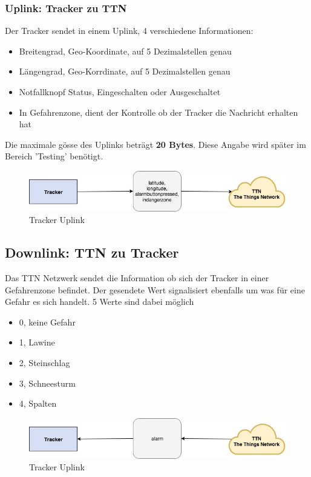 \documentclass[11pt,english,german]{report}
\theoremstyle{definition}
\begin{document}
\subsubsection{Uplink: Tracker zu TTN}
Der Tracker sendet in einem Uplink, 4 verschiedene Informationen:
\begin{itemize}
	\item Breitengrad, Geo-Koordinate, auf 5 Dezimalstellen genau
	\item Längengrad, Geo-Korrdinate, auf 5 Dezimalstellen genau
	\item Notfallknopf Status, Eingeschalten oder Ausgeschaltet
	\item In Gefahrenzone, dient der Kontrolle ob der Tracker die Nachricht erhalten hat
\end{itemize}
Die maximale gösse des Uplinks beträgt \textbf{20 Bytes}. Diese Angabe wird später im Bereich 'Testing' benötigt.
\begin{figure}[H]
	\centering
	\includegraphics[width=\textwidth]{img/system/dataflow_tracker2ttn_uplink.jpg}
	\caption[Tracker Uplink]
	{Tracker Uplink}
\end{figure}

\subsection{Downlink: TTN zu Tracker}
Das TTN Netzwerk sendet die Information ob sich der Tracker in einer Gefahrenzone befindet. Der gesendete Wert signalisiert ebenfalls um was für eine Gefahr es sich handelt. 5 Werte sind dabei möglich
\begin{itemize}
	\item 0, keine Gefahr
	\item 1, Lawine
	\item 2, Steinschlag
	\item 3, Schneesturm
	\item 4, Spalten
\end{itemize}

\begin{figure}[H]
	\centering
	\includegraphics[width=\textwidth]{img/system/dataflow_tracker2ttn_downlink.jpg}
	\caption[Tracker Uplink]
	{Tracker Uplink}
\end{figure}
\end{document}
